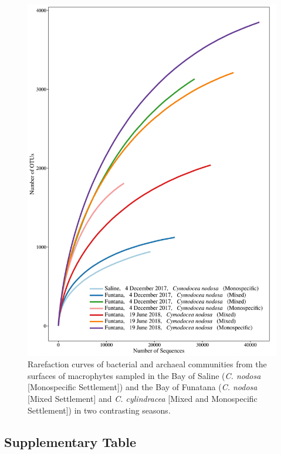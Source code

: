 \documentclass[
  12pt,
]{article}
\begin{document}
\begin{figure}[H]

{\centering \includegraphics[width=0.8\linewidth]{../results/figures/rarefaction} 

}

\caption{Rarefaction curves of bacterial and archaeal communities from the surfaces of macrophytes sampled in the Bay of Saline (\textit{C. nodosa} [Monospecific Settlement]) and the Bay of Funatana (\textit{C. nodosa} [Mixed Settlement] and \textit{C. cylindracea} [Mixed and Monospecific Settlement]) in two contrasting seasons.\label{rarefaction}}\label{fig:unnamed-chunk-1}
\end{figure}

\newpage

\hypertarget{supplementary-table}{%
\subsection{Supplementary Table}\label{supplementary-table}}

\begingroup\fontsize{9}{11}\selectfont
\end{document}
